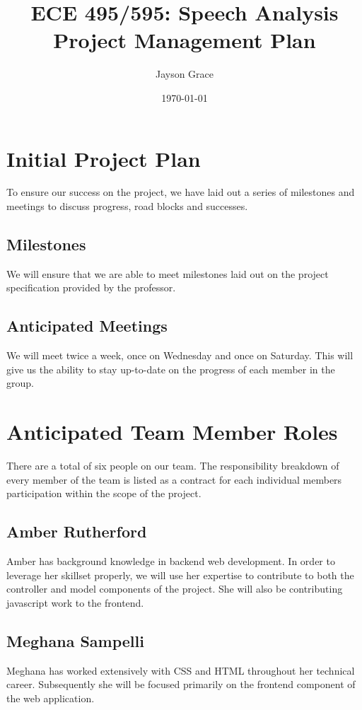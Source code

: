 \documentclass[12pt, a4paper, oneside]{article}
\begin{document}
\title{ECE 495/595: Speech Analysis Project Management Plan}
\author{Jayson Grace}
\date{\today}%
\maketitle

\pagebreak
{}

\section*{Initial Project Plan}
To ensure our success on the project, we have laid out a series of milestones and meetings to discuss progress, road blocks and successes.

\subsection*{Milestones}

We will ensure that we are able to meet milestones laid out on the project specification provided by the professor.

\subsection*{Anticipated Meetings}

We will meet twice a week, once on Wednesday and once on Saturday. This will give us the ability to stay up-to-date on the progress of each member in the group.

\section*{Anticipated Team Member Roles}
There are a total of six people on our team. The responsibility breakdown of every member of the team is listed as a contract for each individual members participation within the scope of the project.

\subsection*{Amber Rutherford}
Amber has background knowledge in backend web development. In order to leverage her skillset properly, we will use her expertise to contribute to both the controller and model components of the project.  She will also be contributing javascript work to the frontend.

\subsection*{Meghana Sampelli}
Meghana has worked extensively with CSS and HTML throughout her technical career. Subsequently she will be focused primarily on the frontend component of the web application.
\end{document}
